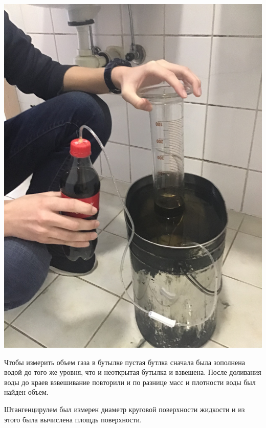 \documentclass[12pt,a4paper]{scrartcl}
\begin{document}
\begin{flushleft}
\includegraphics[scale=0.1]{ToiletFun}
\end{flushleft}
Чтобы измерить объем газа в бутылке пустая бутлка сначала была зополнена водой до того же уровня, что и неоткрытая бутылка и взвешена. После доливания воды до краев взвешивание повторили и по разнице масс и плотности воды был найден объем.

Штангенцирулем был измерен диаметр круговой поверхности жидкости и из этого была вычислена площдь поверхности.
\end{document}
